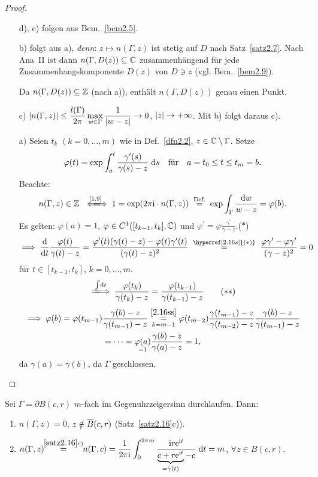 \documentclass[a4paper,twoside,DIV15,BCOR12mm]{scrbook}
\begin{document}
\begin{proof}\begin{itemize}
\item[d),]e) folgen aus Bem.~\ref{bem2.5}.

\item[b)] folgt aus a), \textit{denn}: $z\mapsto n(\Gamma,z)$ ist stetig auf $D$ nach Satz~\ref{satz2.7}. Nach Ana~II ist dann $n(\Gamma,D(z))\subseteq\mathbb{C}$ zusammenhängend für jede Zusammenhangskomponente $D(z)$ von $D\ni z$ (vgl. Bem.~\ref{bem2.9}).

Da $n(\Gamma,D(z))\subseteq\mathbb{Z}$ (nach a)), enthält $n(\Gamma,D(z))$ genau einen Punkt.

\item[c)] $\displaystyle\left\lvert n(\Gamma,z)\right\lvert\leq\frac{l(\Gamma)}{2\pi}\max_{w\in\Gamma}\frac{1}{\left\lvert w-z\right\lvert}\rightarrow 0$, $\left\lvert z\right\lvert\rightarrow+\infty$. Mit b) folgt daraus c).

\item[a)] Seien $t_k$ $(k=0,\dotsc,m)$ wie in Def.~\ref{dfn2.2}, $z\in\mathbb{C}\setminus\Gamma$. Setze 
\[\varphi(t) = \exp\int_{a}^{t}{\frac{\gamma^\prime(s)}{\gamma(s)-z}}\;\mathrm{d} s\quad\text{für}\quad a = t_0\leq t\leq t_m = b.\]
Beachte:
\[n(\Gamma,z)\in\set{Z}\gdwnach{\eqref{1.9}} 1 = \exp(2\pi\i\cdot n(\Gamma,z)) \nach{=}{Def.} \exp\int_\Gamma\frac{\d w}{w-z} = \varphi(b).\]
Es gelten: $\varphi(a) = 1$, $\varphi\in C^1([t_{k-1},t_k],\mathbb{C})$ und $\varphi^\prime = \varphi\frac{\gamma^\prime}{\gamma-z}$.\label{2.16s}\hfill($*$)
\[\folgt \frac{\d}{\d t}\frac{\varphi(t)}{\gamma(t) - z} = \frac{\varphi^\prime(t)(\gamma(t)-z)-\varphi(t)\gamma^\prime(t)}{(\gamma(t)-z)^2} \wegen{=}{\hyperref[2.16s]{(*)}} \frac{\varphi\gamma^\prime-\varphi\gamma^\prime}{(\gamma-z)^2} = 0\]
für $t\in[t_{k-1},t_k]$, $k=0,\dotsc,m$.
\[\label{2.16ss}\folgtwegen{\int\!\d t}\frac{\varphi(t_k)}{\gamma(t_k)-z} = \frac{\varphi(t_{k-1})}{\gamma(t_{k-1})-z}\tag{$**$}\]
\begin{align*}
\implies\varphi(b)=\varphi(t_{m-1})&\frac{\gamma(b)-z}{\gamma(t_{m-1})-z} \overset{\eqref{2.16ss}}{\underset{k=m-1}{=}} \varphi(t_{m-2})\frac{\gamma(t_{m-1})-z}{\gamma(t_{m-2})-z}\frac{\gamma(b)-z}{\gamma(t_{m-1})-z}\\& = \dotsb = \underset{=1}{\varphi(a)}\frac{\gamma(b)-z}{\gamma(a)-z} = 1,
\end{align*}
da $\gamma(a) = \gamma(b)$, da $\Gamma$ geschlossen.\qedhere
\end{itemize}
\end{proof}

\begin{bsp}\label{bsp2.17}
Sei $\Gamma = \partial B(c,r)$ $m$-fach im Gegenuhrzeigersinn durchlaufen. Dann:
\begin{enumerate}
\item $n(\Gamma,z) = 0$, $z\notin \overline{B}(c,r)$ (Satz~\ref{satz2.16}c)).
\item $\displaystyle n(\Gamma,z)\!\! \overset{\ref{satz2.16}c)}{=}\!\! n(\Gamma,c) = \frac{1}{2\pi\mathrm{i}}\int_{0}^{2\pi m}{\frac{\mathrm{i} r\mathrm{e}^{\mathrm{i} t}}{\underbrace{c+r\mathrm{e}^{\mathrm{i} t}}_{=\gamma(t)}-c}}\;\mathrm{d} t = m$, $\forall z\in B(c,r)$.
\end{enumerate}
\end{bsp}
\end{document}
